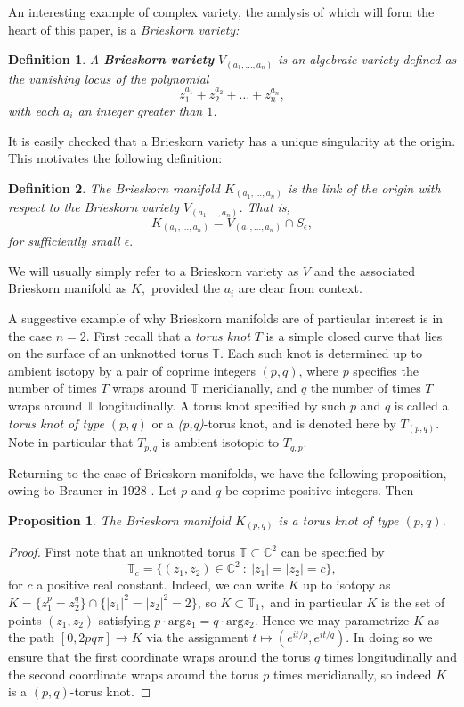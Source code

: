 \documentclass{article}
\newtheorem{proposition}{Proposition}[section]
\newtheorem{definition}{Definition}[section]
\begin{document}
An interesting example of complex variety, the analysis of which will form the heart of this paper, is a \textit{Brieskorn variety:}
\begin{definition}
A \textbf{Brieskorn variety} $V_{(a_1, \dots, a_n)}$ is an algebraic variety defined as the vanishing locus of the polynomial
\[z_1^{a_1} + z_2^{a_2} + \dots + z_n^{a_n},\]
with each $a_i$ an integer greater than $1$.
\end{definition}
It is easily checked that a Brieskorn variety has a unique singularity at the origin. This motivates the following definition:
\begin{definition}
The \textit{Brieskorn manifold} $K_{(a_1, \dots, a_n)}$ is the link of the origin with respect to the Brieskorn variety $V_{(a_1, \dots, a_n)}$. That is, 
\[K_{(a_1, \dots, a_n)} = V_{(a_1, \dots, a_n)} \cap S_\epsilon,\]
for sufficiently small $\epsilon.$
\end{definition}

We will usually simply refer to a Brieskorn variety as $V$ and the associated Brieskorn manifold as $K,$ provided the $a_i$ are clear from context.

A suggestive example of why Brieskorn manifolds are of particular interest is in the case $n=2.$ First recall that a \textit{torus knot} $T$ is a simple closed curve that lies on the surface of an unknotted torus $\mathbb{T}$. Each such knot is determined up to ambient isotopy by a pair of coprime integers $(p,q)$, where $p$ specifies the number of times $T$ wraps around $\mathbb{T}$ meridianally, and $q$ the number of times $T$ wraps around $\mathbb{T}$ longitudinally. A torus knot specified by such $p$ and $q$ is called a \textit{torus knot of type $(p,q)$} or a \textit{(p,q)}-torus knot, and is denoted here by $T_{(p,q)}$. Note in particular that $T_{p,q}$ is ambient isotopic to $T_{q,p}$.

Returning to the case of Brieskorn manifolds, we have the following proposition, owing to Brauner in 1928 \cite{brauner_1928}. Let $p$ and $q$ be coprime positive integers. Then
\begin{proposition}
The Brieskorn manifold $K_{(p,q)}$ is a torus knot of type $(p,q)$.
\end{proposition}
\begin{proof}
First note that an unknotted torus $\mathbb{T} \subset \mathbb{C}^2$ can be specified by 
\[\mathbb{T}_c = \{(z_1, z_2) \in \mathbb{C}^2\ :\ |z_1| = |z_2| = c\},\]
for $c$ a positive real constant. Indeed, we can write $K$ up to isotopy as $K = \{z_1^p = z_2^q\} \cap \{|z_1|^2 = |z_2|^2 = 2\}$, so $K \subset \mathbb{T}_1,$ and in particular $K$ is the set of points $(z_1, z_2)$ satisfying $p \cdot \mathrm{arg}z_1 = q \cdot \mathrm{arg}z_2$. Hence we may parametrize $K$ as the path $[0, 2pq \pi] \to K$ via the assignment $t \mapsto (e^{it/p}, e^{it/q})$. In doing so we ensure that the first coordinate wraps around the torus $q$ times longitudinally and the second coordinate wraps around the torus $p$ times meridianally, so indeed $K$ is a $(p,q)$-torus knot.

\end{proof}
\end{document}
